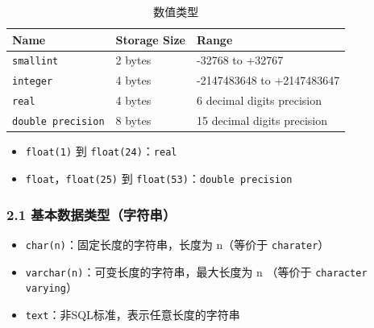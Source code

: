 \documentclass[aspectratio=169, 14pt]{beamer}
\begin{document}
\begin{frame}
    \begin{table}
        \caption{数值类型}
        \begin{tabular}{lll}
          \toprule
          Name & Storage Size & Range \\
          \midrule
          \texttt{smallint} & 2 bytes & -32768 to +32767 \\
          \texttt{integer} & 4 bytes & -2147483648 to +2147483647 \\
          \texttt{real} & 4 bytes & 6 decimal digits precision \\ 
          \texttt{double precision} & 8 bytes & 15 decimal digits precision \\
          \bottomrule
        \end{tabular}
    \end{table}
    
\begin{itemize}
    \item \texttt{float(1)} 到 \texttt{float(24)}：\texttt{real}
    \item \texttt{float}，\texttt{float(25)} 到 \texttt{float(53)}：\texttt{double precision} 
\end{itemize}
\end{frame}

\begin{frame}[fragile]
    \frametitle{2.1 基本数据类型（字符串）}
\begin{itemize}
    \item \texttt{char(n)}：固定长度的字符串，长度为 n（等价于 \texttt{charater}）
    \item \texttt{varchar(n)}：可变长度的字符串，最大长度为 n （等价于 \texttt{character varying}）
    \item \texttt{text}：非SQL标准，表示任意长度的字符串
\end{itemize}
\end{frame}
\end{document}
